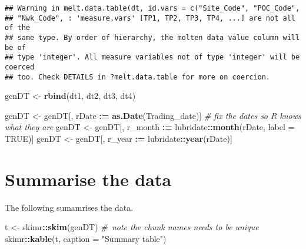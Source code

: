 \documentclass[]{article}
\newenvironment{Shaded}{\begin{snugshade}}{\end{snugshade}}
\newcommand{\KeywordTok}[1]{\textcolor[rgb]{0.13,0.29,0.53}{\textbf{#1}}}
\newcommand{\DataTypeTok}[1]{\textcolor[rgb]{0.13,0.29,0.53}{#1}}
\newcommand{\StringTok}[1]{\textcolor[rgb]{0.31,0.60,0.02}{#1}}
\newcommand{\CommentTok}[1]{\textcolor[rgb]{0.56,0.35,0.01}{\textit{#1}}}
\newcommand{\OtherTok}[1]{\textcolor[rgb]{0.56,0.35,0.01}{#1}}
\newcommand{\OperatorTok}[1]{\textcolor[rgb]{0.81,0.36,0.00}{\textbf{#1}}}
\newcommand{\ErrorTok}[1]{\textcolor[rgb]{0.64,0.00,0.00}{\textbf{#1}}}
\newcommand{\NormalTok}[1]{#1}
\begin{document}
\begin{verbatim}
## Warning in melt.data.table(dt, id.vars = c("Site_Code", "POC_Code",
## "Nwk_Code", : 'measure.vars' [TP1, TP2, TP3, TP4, ...] are not all of the
## same type. By order of hierarchy, the molten data value column will be of
## type 'integer'. All measure variables not of type 'integer' will be coerced
## too. Check DETAILS in ?melt.data.table for more on coercion.
\end{verbatim}

\begin{Shaded}
\begin{Highlighting}[]
\NormalTok{genDT <-}\StringTok{ }\KeywordTok{rbind}\NormalTok{(dt1, dt2, dt3, dt4)}

\NormalTok{genDT <-}\StringTok{ }\NormalTok{genDT[, rDate }\OperatorTok{:}\ErrorTok{=}\StringTok{ }\KeywordTok{as.Date}\NormalTok{(Trading_date)] }\CommentTok{# fix the dates so R knows what they are}
\NormalTok{genDT <-}\StringTok{ }\NormalTok{genDT[, r_month }\OperatorTok{:}\ErrorTok{=}\StringTok{ }\NormalTok{lubridate}\OperatorTok{::}\KeywordTok{month}\NormalTok{(rDate, }\DataTypeTok{label =} \OtherTok{TRUE}\NormalTok{)]}
\NormalTok{genDT <-}\StringTok{ }\NormalTok{genDT[, r_year }\OperatorTok{:}\ErrorTok{=}\StringTok{ }\NormalTok{lubridate}\OperatorTok{::}\KeywordTok{year}\NormalTok{(rDate)]}
\end{Highlighting}
\end{Shaded}

\section{Summarise the data}\label{summarise-the-data}

The following sumamrises the data.

\begin{Shaded}
\begin{Highlighting}[]
\NormalTok{t <-}\StringTok{ }\NormalTok{skimr}\OperatorTok{::}\KeywordTok{skim}\NormalTok{(genDT)}
\CommentTok{# note the chunk names needs to be unique}
\NormalTok{skimr}\OperatorTok{::}\KeywordTok{kable}\NormalTok{(t, }\DataTypeTok{caption =} \StringTok{"Summary table"}\NormalTok{)}
\end{Highlighting}
\end{Shaded}
\end{document}
